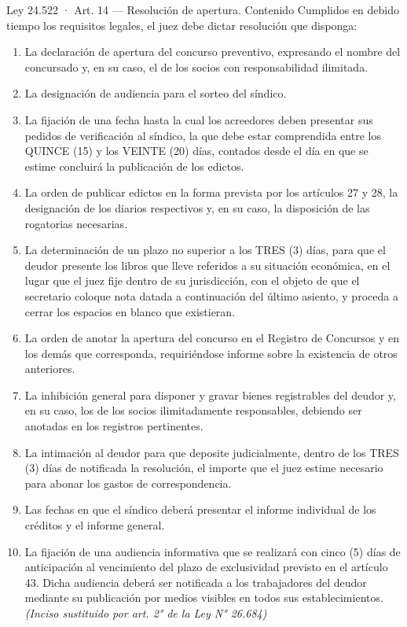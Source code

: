 \documentclass[12pt,oneside]{book}
\begin{document}
\begin{norma}{Ley 24.522 · Art. 14 — Resolución de apertura. Contenido}
Cumplidos en debido tiempo los requisitos legales, el juez debe dictar resolución que disponga:
\begin{enumerate}[label=\arabic*),leftmargin=*]
    \item La declaración de apertura del concurso preventivo, expresando el nombre del concursado y, en su caso, el de los socios con responsabilidad ilimitada.
    \item La designación de audiencia para el sorteo del síndico.
    \item La fijación de una fecha hasta la cual los acreedores deben presentar sus pedidos de verificación al síndico, la que debe estar comprendida entre los QUINCE (15) y los VEINTE (20) días, contados desde el día en que se estime concluirá la publicación de los edictos.
    \item La orden de publicar edictos en la forma prevista por los artículos 27 y 28, la designación de los diarios respectivos y, en su caso, la disposición de las rogatorias necesarias.
    \item La determinación de un plazo no superior a los TRES (3) días, para que el deudor presente los libros que lleve referidos a su situación económica, en el lugar que el juez fije dentro de su jurisdicción, con el objeto de que el secretario coloque nota datada a continuación del último asiento, y proceda a cerrar los espacios en blanco que existieran.
    \item La orden de anotar la apertura del concurso en el Registro de Concursos y en los demás que corresponda, requiriéndose informe sobre la existencia de otros anteriores.
    \item La inhibición general para disponer y gravar bienes registrables del deudor y, en su caso, los de los socios ilimitadamente responsables, debiendo ser anotadas en los registros pertinentes.
    \item La intimación al deudor para que deposite judicialmente, dentro de los TRES (3) días de notificada la resolución, el importe que el juez estime necesario para abonar los gastos de correspondencia.
    \item Las fechas en que el síndico deberá presentar el informe individual de los créditos y el informe general.
    \item La fijación de una audiencia informativa que se realizará con cinco (5) días de anticipación al vencimiento del plazo de exclusividad previsto en el artículo 43. Dicha audiencia deberá ser notificada a los trabajadores del deudor mediante su publicación por medios visibles en todos sus establecimientos. \textit{(Inciso sustituido por art. 2° de la Ley N° 26.684)}

\end{enumerate}
\end{norma}
\end{document}
